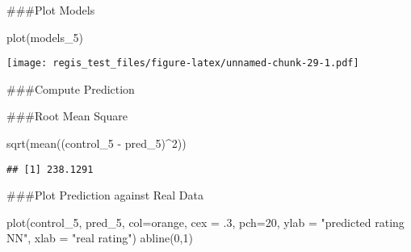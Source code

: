 \documentclass[
]{article}
\newenvironment{Shaded}{\begin{snugshade}}{\end{snugshade}}
\newcommand{\AttributeTok}[1]{\textcolor[rgb]{0.77,0.63,0.00}{#1}}
\newcommand{\DecValTok}[1]{\textcolor[rgb]{0.00,0.00,0.81}{#1}}
\newcommand{\FunctionTok}[1]{\textcolor[rgb]{0.00,0.00,0.00}{#1}}
\newcommand{\NormalTok}[1]{#1}
\newcommand{\OtherTok}[1]{\textcolor[rgb]{0.56,0.35,0.01}{#1}}
\newcommand{\SpecialCharTok}[1]{\textcolor[rgb]{0.00,0.00,0.00}{#1}}
\newcommand{\StringTok}[1]{\textcolor[rgb]{0.31,0.60,0.02}{#1}}
\begin{document}
\#\#\#Plot Models

\begin{Shaded}
\begin{Highlighting}[]
\FunctionTok{plot}\NormalTok{(models\_5)}
\end{Highlighting}
\end{Shaded}

\texttt{[image: regis\_test\_files/figure-latex/unnamed-chunk-29-1.pdf]}

\#\#\#Compute Prediction

\begin{Shaded}
\end{Shaded}

\#\#\#Root Mean Square

\begin{Shaded}
\begin{Highlighting}[]
\FunctionTok{sqrt}\NormalTok{(}\FunctionTok{mean}\NormalTok{((control\_5 }\SpecialCharTok{{-}}\NormalTok{ pred\_5)}\SpecialCharTok{\^{}}\DecValTok{2}\NormalTok{))}
\end{Highlighting}
\end{Shaded}

\begin{verbatim}
## [1] 238.1291
\end{verbatim}

\#\#\#Plot Prediction against Real Data

\begin{Shaded}
\begin{Highlighting}[]
\FunctionTok{plot}\NormalTok{(control\_5, pred\_5, }\AttributeTok{col=}\StringTok{\textquotesingle{}orange\textquotesingle{}}\NormalTok{, }\AttributeTok{cex =}\NormalTok{ .}\DecValTok{3}\NormalTok{, }\AttributeTok{pch=}\DecValTok{20}\NormalTok{, }\AttributeTok{ylab =} \StringTok{"predicted rating NN"}\NormalTok{, }\AttributeTok{xlab =} \StringTok{"real rating"}\NormalTok{)}
\FunctionTok{abline}\NormalTok{(}\DecValTok{0}\NormalTok{,}\DecValTok{1}\NormalTok{)}
\end{Highlighting}
\end{Shaded}
\end{document}
